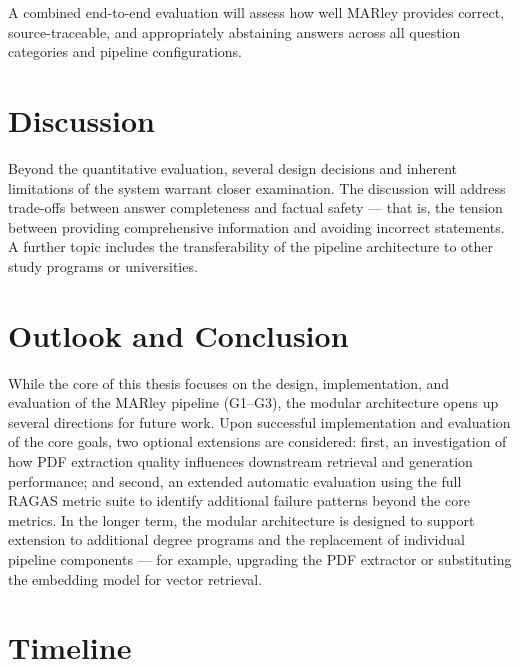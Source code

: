 \documentclass[10pt,twocolumn]{article}
\begin{document}
A combined end-to-end evaluation will assess how well MARley provides correct, source-traceable, and appropriately abstaining answers across all question categories and pipeline configurations.

\section{Discussion}

Beyond the quantitative evaluation, several design decisions and inherent limitations of the system warrant closer examination. The discussion will address trade-offs between answer completeness and factual safety --- that is, the tension between providing comprehensive information and avoiding incorrect statements. A further topic includes the transferability of the pipeline architecture to other study programs or universities.

\section{Outlook and Conclusion}

While the core of this thesis focuses on the design, implementation, and evaluation of the MARley pipeline (G1--G3), the modular architecture opens up several directions for future work. Upon successful implementation and evaluation of the core goals, two optional extensions are considered: first, an investigation of how PDF extraction quality influences downstream retrieval and generation performance; and second, an extended automatic evaluation using the full RAGAS metric suite to identify additional failure patterns beyond the core metrics. In the longer term, the modular architecture is designed to support extension to additional degree programs and the replacement of individual pipeline components --- for example, upgrading the PDF extractor or substituting the embedding model for vector retrieval.

\section{Timeline}
\end{document}
